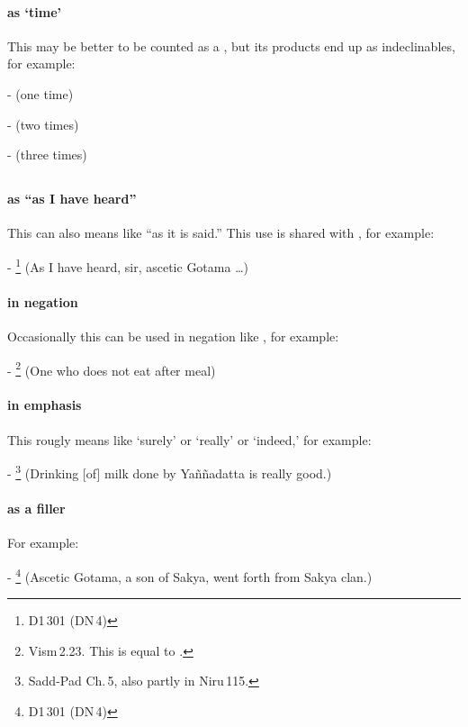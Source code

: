 \paragraph*{ as `time'} This may be better to be counted as a , but its products end up as indeclinables, for example:\par
-  (one time) \par
-  (two times) \par
-  (three times) \par

\subsection*{}\label{nip:khalu}
\paragraph*{ as ``as I have heard''} This can also means like ``as it is said.'' This use is shared with , for example:\par
- \footnote{D1\,301 (DN\,4)} (As I have heard, sir, ascetic Gotama \ldots) \par
\paragraph*{ in negation} Occasionally this can be used in negation like , for example:\par
- \footnote{Vism\,2.23. This is equal to .} (One who does not eat after meal) \par
\paragraph*{ in emphasis} This rougly means like `surely' or `really' or `indeed,' for example:\par
- \footnote{Sadd-Pad Ch.\,5, also partly in Niru\,115.} (Drinking [of] milk done by Ya\~n\~nadatta is really good.) \par
\paragraph*{ as a filler} For example:\par
- \footnote{D1\,301 (DN\,4)} (Ascetic Gotama, a son of Sakya, went forth from Sakya clan.) \par

